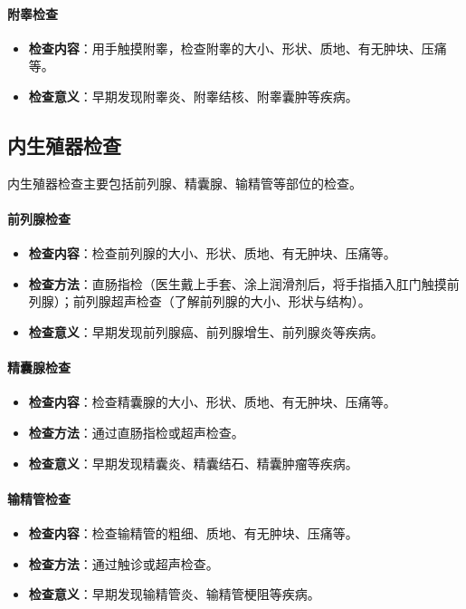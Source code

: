 \documentclass[12pt,a4paper,twoside]{ctexbook}
\begin{document}
\paragraph{附睾检查}
\begin{itemize}
\item \textbf{检查内容}：用手触摸附睾，检查附睾的大小、形状、质地、有无肿块、压痛等。
\item \textbf{检查意义}：早期发现附睾炎、附睾结核、附睾囊肿等疾病。
\end{itemize}

\subsection{内生殖器检查}

内生殖器检查主要包括前列腺、精囊腺、输精管等部位的检查。

\paragraph{前列腺检查}
\begin{itemize}
\item \textbf{检查内容}：检查前列腺的大小、形状、质地、有无肿块、压痛等。
\item \textbf{检查方法}：直肠指检（医生戴上手套、涂上润滑剂后，将手指插入肛门触摸前列腺）；前列腺超声检查（了解前列腺的大小、形状与结构）。
\item \textbf{检查意义}：早期发现前列腺癌、前列腺增生、前列腺炎等疾病。
\end{itemize}

\paragraph{精囊腺检查}
\begin{itemize}
\item \textbf{检查内容}：检查精囊腺的大小、形状、质地、有无肿块、压痛等。
\item \textbf{检查方法}：通过直肠指检或超声检查。
\item \textbf{检查意义}：早期发现精囊炎、精囊结石、精囊肿瘤等疾病。
\end{itemize}

\paragraph{输精管检查}
\begin{itemize}
\item \textbf{检查内容}：检查输精管的粗细、质地、有无肿块、压痛等。
\item \textbf{检查方法}：通过触诊或超声检查。
\item \textbf{检查意义}：早期发现输精管炎、输精管梗阻等疾病。
\end{itemize}
\end{document}
